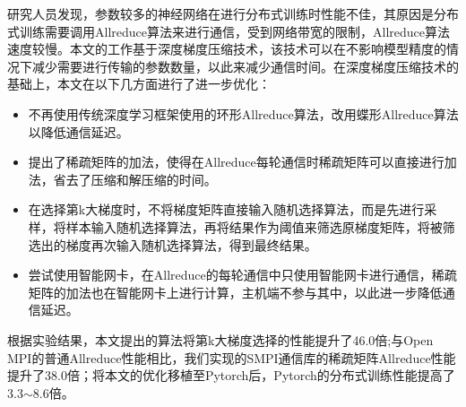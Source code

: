 \begin{cabstract}
  研究人员发现，参数较多的神经网络在进行分布式训练时性能不佳，其原因是分布式训练需要调用Allreduce算法来进行通信，受到网络带宽的限制，Allreduce算法速度较慢。本文的工作基于深度梯度压缩技术，该技术可以在不影响模型精度的情况下减少需要进行传输的参数数量，以此来减少通信时间。在深度梯度压缩技术的基础上，本文在以下几方面进行了进一步优化：
  \begin{itemize}
    \item 不再使用传统深度学习框架使用的环形Allreduce算法，改用蝶形Allreduce算法以降低通信延迟。
    \item 提出了稀疏矩阵的加法，使得在Allreduce每轮通信时稀疏矩阵可以直接进行加法，省去了压缩和解压缩的时间。
    \item 在选择第k大梯度时，不将梯度矩阵直接输入随机选择算法，而是先进行采样，将样本输入随机选择算法，再将结果作为阈值来筛选原梯度矩阵，将被筛选出的梯度再次输入随机选择算法，得到最终结果。
    \item 尝试使用智能网卡，在Allreduce的每轮通信中只使用智能网卡进行通信，稀疏矩阵的加法也在智能网卡上进行计算，主机端不参与其中，以此进一步降低通信延迟。
\end{itemize}

根据实验结果，本文提出的算法将第k大梯度选择的性能提升了46.0倍;与Open MPI的普通Allreduce性能相比，我们实现的SMPI通信库的稀疏矩阵Allreduce性能提升了38.0倍；将本文的优化移植至Pytorch后，Pytorch的分布式训练性能提高了3.3$\sim$8.6倍。
\end{cabstract}


